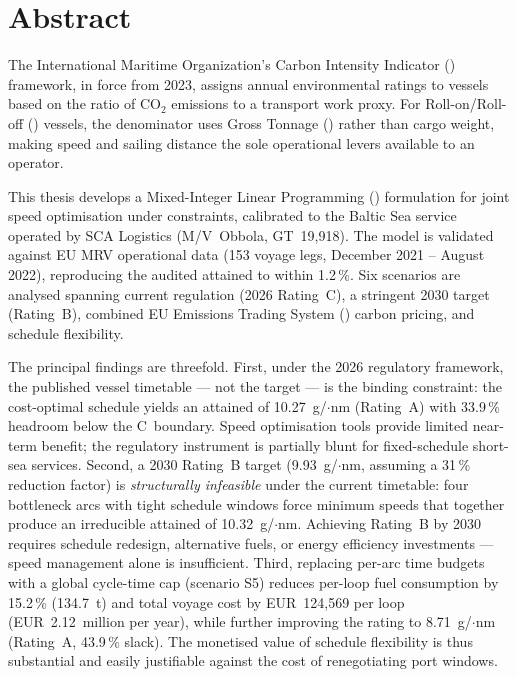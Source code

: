 \section*{Abstract}

The International Maritime Organization's Carbon Intensity Indicator (\CII{})
framework, in force from 2023, assigns annual environmental ratings to vessels
based on the ratio of CO$_2$ emissions to a transport work proxy.  For
Roll-on/Roll-off (\RoRo{}) vessels, the denominator uses Gross Tonnage (\GT{})
rather than cargo weight, making speed and sailing distance the sole operational
levers available to an operator.

This thesis develops a Mixed-Integer Linear Programming (\MILP{}) formulation
for joint speed optimisation under \CII{} constraints, calibrated to the Baltic
Sea \RoRo{} service operated by SCA Logistics (M/V~Obbola, GT~19{,}918).
The model is validated against EU MRV operational data (153 voyage legs,
December 2021 -- August 2022), reproducing the audited attained \CII{} to within
1.2\,\%.  Six scenarios are analysed spanning current regulation (2026 Rating~C),
a stringent 2030 target (Rating~B), combined EU Emissions Trading System (\ETS{})
carbon pricing, and schedule flexibility.

The principal findings are threefold.  First, under the 2026 regulatory
framework, the published vessel timetable --- not the \CII{} target --- is the
binding constraint: the cost-optimal schedule yields an attained \CII{} of
10.27~g/\GT{}$\cdot$nm (Rating~A) with 33.9\,\% headroom below the C~boundary.
Speed optimisation tools provide limited near-term benefit; the regulatory
instrument is partially blunt for fixed-schedule short-sea services.  Second,
a 2030 Rating~B target (9.93~g/\GT{}$\cdot$nm, assuming a 31\,\% reduction
factor) is \emph{structurally infeasible} under the current timetable: four
bottleneck arcs with tight schedule windows force minimum speeds that together
produce an irreducible attained \CII{} of 10.32~g/\GT{}$\cdot$nm.  Achieving
Rating~B by 2030 requires schedule redesign, alternative fuels, or energy
efficiency investments --- speed management alone is insufficient.  Third,
replacing per-arc time budgets with a global cycle-time cap (scenario S5)
reduces per-loop fuel consumption by 15.2\,\% (134.7~t) and total voyage cost
by EUR~124{,}569 per loop (EUR~2.12~million per year), while further improving
the \CII{} rating to 8.71~g/\GT{}$\cdot$nm (Rating~A, 43.9\,\% slack).  The
monetised value of schedule flexibility is thus substantial and easily
justifiable against the cost of renegotiating port windows.

